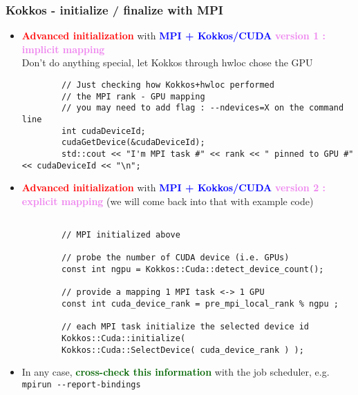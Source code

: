 \begin{frame}[fragile=singleslide]
  \frametitle{Kokkos - initialize / finalize with MPI}

  \begin{itemize}
  \item \textcolor{red}{\textbf{Advanced initialization}} with \textcolor{blue}{\textbf{MPI + Kokkos/CUDA}} \textcolor{violet}{\textbf{version 1 : implicit mapping}}\\
    Don't do anything special, let Kokkos through hwloc chose the GPU
    {\scriptsize
      \begin{verbatim}
        // Just checking how Kokkos+hwloc performed
        // the MPI rank - GPU mapping
        // you may need to add flag : --ndevices=X on the command line
        int cudaDeviceId;
        cudaGetDevice(&cudaDeviceId);
        std::cout << "I'm MPI task #" << rank << " pinned to GPU #" << cudaDeviceId << "\n";
      \end{verbatim} 
    }
  \item \textcolor{red}{\textbf{Advanced initialization}} with \textcolor{blue}{\textbf{MPI + Kokkos/CUDA}} \textcolor{violet}{\textbf{version 2 : explicit mapping}}
    (we will come back into that with example code)
    {\scriptsize
      \begin{verbatim}
        
        // MPI initialized above
        
        // probe the number of CUDA device (i.e. GPUs)
        const int ngpu = Kokkos::Cuda::detect_device_count();
        
        // provide a mapping 1 MPI task <-> 1 GPU
        const int cuda_device_rank = pre_mpi_local_rank % ngpu ;
        
        // each MPI task initialize the selected device id
        Kokkos::Cuda::initialize(
        Kokkos::Cuda::SelectDevice( cuda_device_rank ) );
      \end{verbatim}
    }
  \item In any case, \textcolor{darkgreen}{\bf cross-check this information} with the job scheduler, e.g. \texttt{mpirun \--\--report-bindings}
  \end{itemize}
\end{frame}

